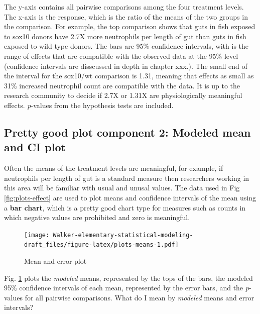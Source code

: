 \documentclass[]{book}
\begin{document}
The y-axis contains all pairwise comparisons among the four treatment levels. The x-axis is the response, which is the ratio of the means of the two groups in the comparison. For example, the top comparison shows that guts in fish exposed to sox10 donors have 2.7X more neutrophils per length of gut than guts in fish exposed to wild type donors. The bars are 95\% confidence intervals, with is the range of effects that are compatible with the observed data at the 95\% level (confidence intervals are disscussed in depth in chapter xxx.). The small end of the interval for the sox10/wt comparison is 1.31, meaning that effects as small as 31\% increased neutrophil count are compatible with the data. It is up to the research community to decide if 2.7X or 1.31X are physiologically meaningful effects. \emph{p}-values from the hypothesis tests are included.

\hypertarget{pretty-good-plot-component-2-modeled-mean-and-ci-plot}{%
\subsection{Pretty good plot component 2: Modeled mean and CI plot}\label{pretty-good-plot-component-2-modeled-mean-and-ci-plot}}

Often the means of the treatment levels are meaningful, for example, if neutrophils per length of gut is a standard measure then researchers working in this area will be familiar with usual and unusal values. The data used in Fig \ref{fig:plots-effect} are used to plot means and confidence intervals of the mean using a \textbf{bar chart}, which is a pretty good chart type for measures such as counts in which negative values are prohibited and zero is meaningful.

\begin{figure}
\centering
\texttt{[image: Walker-elementary-statistical-modeling-draft\_files/figure-latex/plots-means-1.pdf]}
\caption{\label{fig:plots-means}Mean and error plot}
\end{figure}

Fig. \ref{fig:plots-means} plots the \emph{modeled} means, represented by the tops of the bars, the modeled 95\% confidence intervals of each mean, represented by the error bars, and the \emph{p}-values for all pairwise comparisons. What do I mean by \emph{modeled} means and error intervals?
\end{document}
